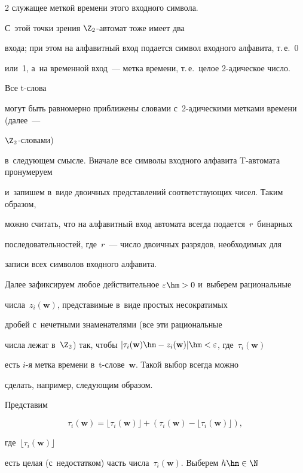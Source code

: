 \begin{multicols}{2}
служащее меткой времени этого входного символа.  


С~этой точки зрения $\Z_2$-автомат тоже имеет два


входа; при этом на алфавитный вход подается символ входного алфавита, т.\,е.~0 


или~1, а~на временной вход~--- метка времени, т.\,е.\ целое 2-ади\-че\-ское \mbox{число}.





Все t-слова


могут быть равномерно приближены словами с~2-ади\-че\-ски\-ми метками времени (далее~--- 


$\Z_2$-сло\-ва\-ми)


в~следующем смысле. Вначале все символы входного алфавита T-ав\-то\-ма\-та пронумеруем 


и~запишем в~виде двоичных представлений соответствующих чисел. Таким образом,


можно считать, что на алфавитный вход автомата всегда подается~$r$~бинарных 


последовательностей, где~$r$~--- число двоичных разрядов, необходимых для


записи всех символов входного алфавита.





Далее зафиксируем любое действительное $\varepsilon\hm>0$ и~выберем  рациональные 


числа~$z_i(\mathbf w)$, представимые в~виде простых несократимых


дробей с~нечетными знаменателями (все эти рациональные


числа лежат в~$\Z_2$) так, чтобы $|\tau_i(\mathbf w)\hm-z_i(\mathbf w)|


\hm<\varepsilon$, где~$\tau_i(\mathbf w)$


есть $i$-я метка времени в~t-сло\-ве~$\mathbf w$.  Такой выбор всегда можно


сделать, например, следующим образом.


Представим 


$$


\tau_i(\mathbf w)=\lfloor\tau_i(\mathbf w)\rfloor 


+ \left(\tau_i(\mathbf w)-\lfloor\tau_i(\mathbf w)\rfloor\right),


$$ 


где~$\lfloor\tau_i(\mathbf w)\rfloor$


есть целая (с~недостатком) часть чис\-ла~$\tau_i(\mathbf w)$. Выберем $h\hm\in\N$



\end{multicols}
